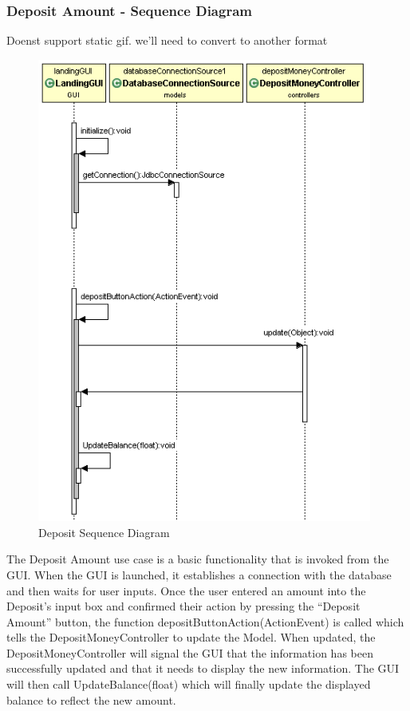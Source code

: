 \documentclass[12pt]{article}
\begin{document}
\subsubsection{Deposit Amount - Sequence Diagram}
 Doenst support static gif. we'll need to convert to another format
\begin{figure}[h!]
  \centering
  \includegraphics[width=110mm]{deposit_sequence.png}
  \caption{Deposit Sequence Diagram}
\end{figure}


The Deposit Amount use case is a basic functionality that is invoked from the GUI. When the GUI is launched, it establishes a connection with the database and then waits for user inputs. Once the user entered an amount into the Deposit’s input box and confirmed their action by pressing the “Deposit Amount” button, the function depositButtonAction(ActionEvent) is called which tells the DepositMoneyController to update the Model. When updated, the DepositMoneyController will signal the GUI that the information has been successfully updated and that it needs to display the new information. The GUI will then call UpdateBalance(float) which will finally update the displayed balance to reflect the new amount.
\end{document}
